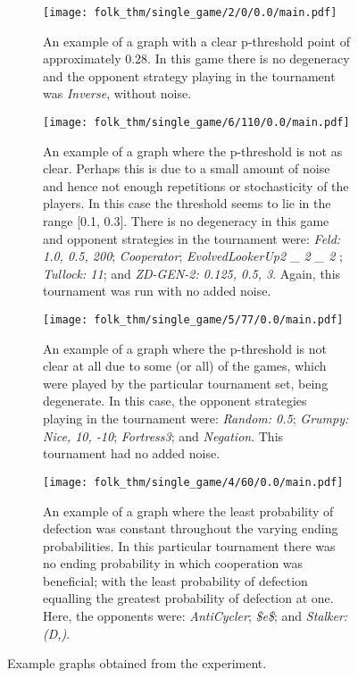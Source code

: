 \begin{figure}
    \begin{subfigure}{.45\textwidth}
        \centering
        \texttt{[image: folk\_thm/single\_game/2/0/0.0/main.pdf]}
        \caption{An example of a graph with a clear p-threshold point of approximately 0.28. In this game there is no degeneracy and the opponent strategy playing in the tournament was \textit{Inverse}, without noise.}\label{subfig:clear_thresh_plot}
    \end{subfigure}
    \begin{subfigure}{.45\textwidth}
        \centering
        \texttt{[image: folk\_thm/single\_game/6/110/0.0/main.pdf]}
        \caption{An example of a graph where the p-threshold is not as clear. Perhaps this is due to a small amount of noise and hence not enough repetitions or stochasticity of the players. In this case the threshold seems to lie in the range [0.1, 0.3]. There is no degeneracy in this game and opponent strategies in the tournament were: \textit{Feld: 1.0, 0.5, 200}; \textit{Cooperator};  \textit{EvolvedLookerUp2 _ 2 _ 2 }; \textit{Tullock: 11}; and \textit{ZD-GEN-2: 0.125, 0.5, 3}. Again, this tournament was run with no added noise.}\label{subfig:unclear_thresh_plot}
    \end{subfigure}


    \newline


    \begin{subfigure}{.45\textwidth}
        \centering
        \texttt{[image: folk\_thm/single\_game/5/77/0.0/main.pdf]}
        \caption{An example of a graph where the p-threshold is not clear at all due to some (or all) of the games, which were played by the particular tournament set, being degenerate. In this case, the opponent strategies playing in the tournament were: \textit{Random: 0.5}; \textit{Grumpy: Nice, 10, -10}; \textit{Fortress3}; and \textit{Negation}. This tournament had no added noise.}\label{subfig:degenerate_plot}
    \end{subfigure}
    \begin{subfigure}{.45\textwidth}
        \centering
        \texttt{[image: folk\_thm/single\_game/4/60/0.0/main.pdf]}
        \caption{An example of a graph where the least probability of defection
        was constant throughout the varying ending probabilities. In this
        particular tournament there was no ending probability in which
        cooperation was beneficial; with the least probability of defection
        equalling the greatest probability of defection at one. Here, the
        opponents were: \textit{AntiCycler}; \textit{\$e\$}; and
        \textit{Stalker: (D,)}.}\label{subfig:constant_plot}
    \end{subfigure}
    \caption{Example graphs obtained from the experiment.}\label{fig:example_graphs}
\end{figure}

